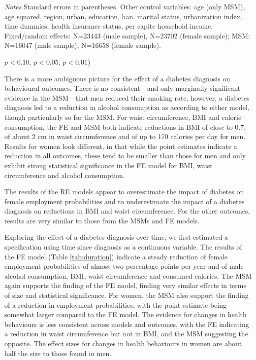 \begin{table}[p]
\begin{adjustbox}{max width=\linewidth, center}
\begin{threeparttable}
{\begin{tabular}{l*{6}{S
S}}
\bottomrule
\end{tabular}
\begin{tablenotes}
\item \textit{Notes} Standard errors in parentheses. Other control variables: age (only MSM), age squared, region, urban, education, han, marital status, urbanization index, time dummies, health insurance status, per capite household income.  Fixed/random effects: N=23443 (male sample), N=23702 (female sample); MSM:  N=16047 (male sample), N=16658 (female sample).
\item \sym{*} \(p<0.10\), \sym{**} \(p<0.05\), \sym{***} \(p<0.01\))
\end{tablenotes}
}
\end{threeparttable}
\end{adjustbox}

\end{table}

There is a more ambiguous picture for the effect of a diabetes diagnosis on behavioural outcomes. There is no consistent---and only marginally significant evidence in the \ac{MSM}---that men reduced their smoking rate, however, a diabetes diagnosis led to a reduction in alcohol consumption as according to either model, though particularly so for the \ac{MSM}. For waist circumference, \ac{BMI} and calorie consumption, the \ac{FE} and \ac{MSM} both indicate reductions in \ac{BMI} of close to 0.7, of about 2 cm in waist circumference and of up to 170 calories per day for men. Results for women look different, in that while the point estimates indicate a reduction in all outcomes, these tend to be smaller than those for men and only exhibit strong statistical significance in the \ac{FE} model for \ac{BMI}, waist circumference and alcohol consumption.

The results of the \ac{RE} models appear to overestimate the impact of diabetes on female employment probabilities and to underestimate the impact of a diabetes diagnosis on reductions in \ac{BMI} and waist circumference. For the other outcomes, results are very similar to those from the \acp{MSM} and \ac{FE} models.

Exploring the effect of a diabetes diagnosis over time, we first estimated a specification using time since diagnosis as a continuous variable. The results of the \ac{FE} model (Table \ref{tab:duration}) indicate a steady reduction of female employment probabilities of almost two percentage points per year and of male alcohol consumption, \ac{BMI}, waist circumference and consumed calories. The \ac{MSM} again supports the finding of the \ac{FE} model, finding very similar effects in terms of size and statistical significance. For women, the \ac{MSM} also support the finding of a reduction in employment probabilities, with the point estimate  being somewhat larger compared to the \ac{FE} model. The evidence for changes in health behaviours is less consistent across models and outcomes, with the \ac{FE} indicating a reduction in waist circumference but not in \ac{BMI}, and the \ac{MSM} suggesting the opposite. The effect sizes for changes in health behaviours in women are about half the size to those found in men. 

